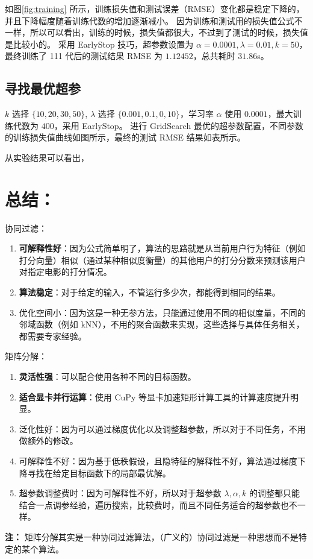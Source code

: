\documentclass[degree=project,degree-type=project]{thuthesis}
\begin{document}
如图\ref{fig:training} 所示，训练损失值和测试误差（RMSE）变化都是稳定下降的，并且下降幅度随着训练代数的增加逐渐减小。
因为训练和测试用的损失值公式不一样，所以可以看出，训练的时候，损失值都很大，不过到了测试的时候，损失值是比较小的。
采用 EarlyStop 技巧，超参数设置为 $\alpha=0.0001, \lambda = 0.01, k=50$，最终训练了 111 代后的测试结果 RMSE 为 $1.12452$，总共耗时 $31.86$s。

\section{寻找最优超参}

$k$ 选择 $\{10, 20, 30, 50\}$, $\lambda$ 选择 $\{0.001, 0.1, 0, 10\}$，学习率 $\alpha$ 使用 $0.0001$，最大训练代数为 $400$，采用 EarlyStop。
进行 GridSearch 最优的超参数配置，不同参数的训练损失值曲线如图所示，最终的测试 RMSE 结果如表所示。

从实验结果可以看出，

\chapter{总结：}

协同过滤：

\begin{enumerate}
  \item \textbf{可解释性好}：因为公式简单明了，算法的思路就是从当前用户行为特征（例如打分向量）相似（通过某种相似度衡量）的其他用户的打分分数来预测该用户对指定电影的打分情况。
  \item \textbf{算法稳定}：对于给定的输入，不管运行多少次，都能得到相同的结果。
  \item {优化空间小}：因为这是一种无参方法，只能通过使用不同的相似度量，不同的邻域函数（例如 kNN），不用的聚合函数来实现，这些选择与具体任务相关，都需要专家经验。
\end{enumerate}

矩阵分解：

\begin{enumerate}
  \item \textbf{灵活性强}：可以配合使用各种不同的目标函数。
  \item \textbf{适合显卡并行运算}：使用 CuPy 等显卡加速矩形计算工具的计算速度提升明显。
  \item {泛化性好}：因为可以通过梯度优化以及调整超参数，所以对于不同任务，不用做额外的修改。
  \item {可解释性不好}：因为基于低秩假设，且隐特征的解释性不好，算法通过梯度下降寻找在给定目标函数下的局部最优解。
  \item {超参数调整费时}：因为可解释性不好，所以对于超参数 $\lambda, \alpha, k$ 的调整都只能结合一点调参经验，遍历搜索，比较费时，而且不同任务适合的超参数也不一样。
\end{enumerate}

\textbf{注：} 矩阵分解其实是一种协同过滤算法，（广义的）协同过滤是一种思想而不是特定的某个算法。

\backmatter


\appendix
\end{document}
